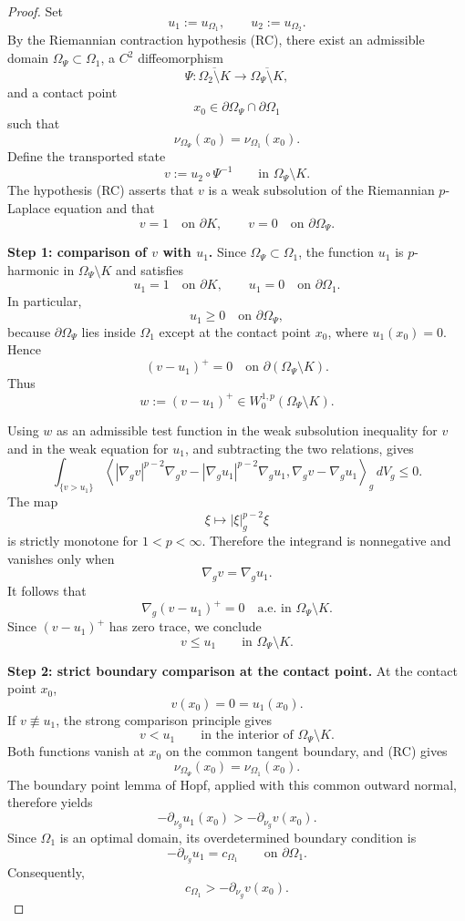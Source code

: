 \documentclass[10pt,a4paper]{amsart}
\begin{document}
\begin{proof}
Set
\[
u_1:=u_{\Omega_1},
\qquad
u_2:=u_{\Omega_2}.
\]
By the Riemannian contraction hypothesis {\rm (RC)}, there exist an
admissible domain $\Omega_\Psi\subset\Omega_1$, a $C^2$ diffeomorphism
\[
\Psi:
\overline{\Omega_2\setminus K}
\longrightarrow
\overline{\Omega_\Psi\setminus K},
\]
and a contact point
\[
x_0\in\partial\Omega_\Psi\cap\partial\Omega_1
\]
such that
\[
\nu_{\Omega_\Psi}(x_0)=\nu_{\Omega_1}(x_0).
\]
Define the transported state
\[
v:=u_2\circ\Psi^{-1}
\qquad\text{in }\Omega_\Psi\setminus K.
\]
The hypothesis {\rm (RC)} asserts that $v$ is a weak subsolution of the
Riemannian $p$-Laplace equation and that
\[
v=1\quad\text{on }\partial K,
\qquad
v=0\quad\text{on }\partial\Omega_\Psi.
\]

\medskip
\noindent\textbf{Step 1: comparison of $v$ with $u_1$.}
Since $\Omega_\Psi\subset\Omega_1$, the function $u_1$ is
$p$-harmonic in $\Omega_\Psi\setminus K$ and satisfies
\[
u_1=1\quad\text{on }\partial K,
\qquad
u_1=0\quad\text{on }\partial\Omega_1.
\]
In particular,
\[
u_1\geq0\quad\text{on }\partial\Omega_\Psi,
\]
because $\partial\Omega_\Psi$ lies inside $\Omega_1$ except at the
contact point $x_0$, where $u_1(x_0)=0$. Hence
\[
(v-u_1)^+=0
\quad\text{on }\partial(\Omega_\Psi\setminus K).
\]
Thus
\[
w:=(v-u_1)^+\in W_0^{1,p}(\Omega_\Psi\setminus K).
\]

Using $w$ as an admissible test function in the weak subsolution
inequality for $v$ and in the weak equation for $u_1$, and subtracting
the two relations, gives
\[
\int_{\{v>u_1\}}
\left\langle
|\nabla_gv|^{p-2}\nabla_gv
-
|\nabla_gu_1|^{p-2}\nabla_gu_1,
\nabla_gv-\nabla_gu_1
\right\rangle_g\,dV_g
\leq0.
\]
The map
\[
\xi\longmapsto|\xi|_g^{p-2}\xi
\]
is strictly monotone for $1<p<\infty$. Therefore the integrand is
nonnegative and vanishes only when
\[
\nabla_gv=\nabla_gu_1.
\]
It follows that
\[
\nabla_g(v-u_1)^+=0
\quad\text{a.e. in }\Omega_\Psi\setminus K.
\]
Since $(v-u_1)^+$ has zero trace, we conclude
\[
v\leq u_1
\qquad\text{in }\Omega_\Psi\setminus K.
\]

\medskip
\noindent\textbf{Step 2: strict boundary comparison at the contact point.}
At the contact point $x_0$,
\[
v(x_0)=0=u_1(x_0).
\]
If $v\not\equiv u_1$, the strong comparison principle gives
\[
v<u_1
\qquad\text{in the interior of }\Omega_\Psi\setminus K.
\]
Both functions vanish at $x_0$ on the common tangent boundary, and
{\rm (RC)} gives
\[
\nu_{\Omega_\Psi}(x_0)=\nu_{\Omega_1}(x_0).
\]
The boundary point lemma of Hopf, applied with this common outward
normal, therefore yields
\[
-\partial_{\nu_g}u_1(x_0)
>
-\partial_{\nu_g}v(x_0).
\]
Since $\Omega_1$ is an optimal domain, its overdetermined boundary
condition is
\[
-\partial_{\nu_g}u_1=c_{\Omega_1}
\qquad\text{on }\partial\Omega_1.
\]
Consequently,
\[
c_{\Omega_1}>
-\partial_{\nu_g}v(x_0).
\]


\end{proof}
\end{document}
